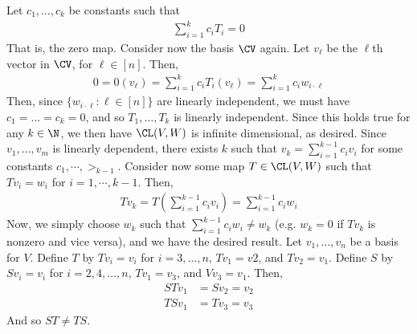 \documentclass{book}
\begin{document}
\begin{enumerate}[label=\arabic*)]
      Let $c_1, \dots, c_k$ be constants such that 
      \begin{align*}
        \sum_{i = 1}^{k}c_iT_i = 0
      \end{align*}
      That is, the zero map. Consider now the basis $\CV$ again. Let $v_\ell$ be the $\ell$th vector in $\CV$, for $\ell \in [n]$. Then,
      \begin{align*}
        0 = 0(v_\ell) = \sum_{i = 1}^{k}c_iT_i(v_\ell) = \sum_{i = 1}^{k}c_iw_{i\cdot\ell}
      \end{align*}
      Then, since $\{w_{i\cdot\ell}: \ell \in [n]\}$ are linearly independent, we must have $c_1 = \dots = c_k = 0$, and so $T_1, \dots, T_k$ is linearly independent. Since this holds true
      for any $k \in \N$, we then have $\CL(V, W)$ is infinite dimensional, as desired.
    \ii
      Since $v_1, \dots, v_m$ is linearly dependent, there exists $k$ such that $v_k = \sum_{i = 1}^{k - 1}c_iv_i$ for some constants $c_1, \cdots, >_{k - 1}$. Consider now some map $T \in
      \CL(V, W)$ such that $Tv_i = w_i$ for $i = 1, \cdots, k - 1$. Then,
      \begin{align*}
        Tv_k = T(\sum_{i = 1}^{k - 1}c_iv_i) = \sum_{i = 1}^{k - 1}c_iw_i
      \end{align*}
      Now, we simply choose $w_k$ such that $\sum_{i = 1}^{k - 1}c_iw_i \neq w_k$ (e.g. $w_k = 0$ if $Tv_k$ is nonzero and vice versa), and we have the desired result.
    \ii
      Let $v_1, \dots, v_n$ be a basis for $V$. Define $T$ by $Tv_i = v_i$ for $i = 3, \dots, n$, $Tv_1 = v2$, and $Tv_2 = v_1$. Define $S$ by $Sv_i = v_i$ for $i = 2, 4, \dots, n$, $Tv_1 =
      v_3$, and $Vv_3 = v_1$. Then,
      \begin{align*}
        STv_1 & = Sv_2 = v_2 \\
        TSv_1 & = Tv_3 = v_3
      \end{align*}
      And so $ST \neq TS$.
      
  \end{enumerate}
\end{document}
